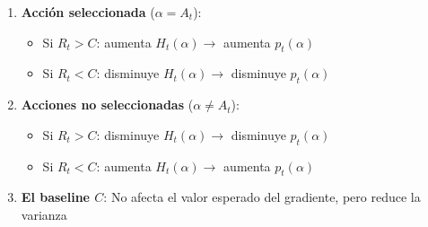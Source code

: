 \documentclass[12pt,a4paper]{article}
\begin{document}
\begin{enumerate}
    \item \textbf{Acción seleccionada} ($\alpha = A_t$): 
    \begin{itemize}
        \item Si $R_t > C$: aumenta $H_t(\alpha) \rightarrow$ aumenta $p_t(\alpha)$
        \item Si $R_t < C$: disminuye $H_t(\alpha) \rightarrow$ disminuye $p_t(\alpha)$
    \end{itemize}
    
    \item \textbf{Acciones no seleccionadas} ($\alpha \neq A_t$):
    \begin{itemize}
        \item Si $R_t > C$: disminuye $H_t(\alpha) \rightarrow$ disminuye $p_t(\alpha)$
        \item Si $R_t < C$: aumenta $H_t(\alpha) \rightarrow$ aumenta $p_t(\alpha)$
    \end{itemize}
    
    \item \textbf{El baseline $C$}: No afecta el valor esperado del gradiente, pero reduce la varianza
\end{enumerate}
\end{document}

